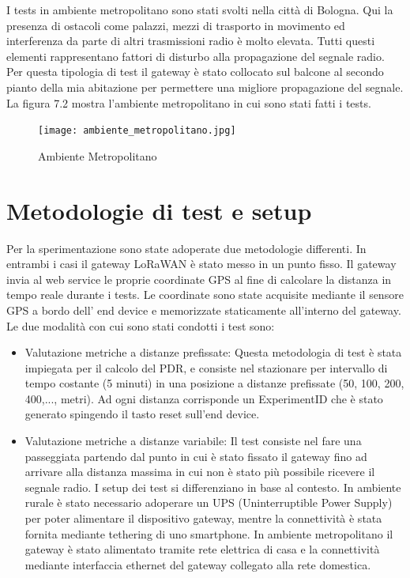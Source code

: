 \documentclass[12pt,a4paper,openright,twoside]{report}
\begin{document}
I tests in ambiente metropolitano sono stati svolti nella citt\`a di Bologna. Qui la presenza di ostacoli come palazzi, mezzi di trasporto in movimento ed interferenza da parte di altri trasmissioni radio \`e molto elevata. Tutti questi elementi rappresentano fattori di disturbo alla propagazione del segnale radio. Per questa tipologia di test il gateway \`e stato collocato sul balcone al secondo pianto della mia abitazione per permettere una migliore propagazione del segnale.
La figura 7.2 mostra l'ambiente metropolitano in cui sono stati fatti i tests.
\begin{figure}[h]                      
\begin{center} 
\texttt{[image: ambiente\_metropolitano.jpg]}
\caption[Ambiente Metropolitano]{Ambiente Metropolitano}\label{fig:prima}
\end{center}
\end{figure}

\section{Metodologie di test e setup}
Per la sperimentazione sono state adoperate due metodologie differenti. In entrambi i casi il gateway LoRaWAN \`e stato messo in un punto fisso. Il gateway invia al web service le proprie coordinate GPS al fine di calcolare la distanza in tempo reale durante i tests. Le coordinate sono state acquisite mediante il sensore GPS a bordo dell' end device e memorizzate staticamente all'interno del gateway.
Le due modalit\`a con cui sono stati condotti i test sono:
\begin{itemize}                       
\item Valutazione metriche a distanze prefissate: Questa metodologia di test \`e stata impiegata per il calcolo del PDR, e consiste nel stazionare per intervallo di tempo costante (5 minuti) in una posizione a distanze prefissate (50, 100, 200, 400,..., metri). Ad ogni distanza corrisponde un ExperimentID che \`e stato generato spingendo il tasto reset sull'end device.
\item Valutazione metriche a distanze variabile: Il test consiste nel fare una passeggiata partendo dal punto in cui \`e stato fissato il gateway fino ad arrivare alla distanza massima in cui non \`e stato pi\`u possibile ricevere il segnale radio.
I setup dei test si differenziano in base al contesto. In ambiente rurale \`e stato necessario adoperare un UPS (Uninterruptible Power Supply) per poter alimentare il dispositivo gateway, mentre la connettivit\`a \`e stata fornita mediante tethering di uno smartphone.  
In ambiente metropolitano il gateway \`e stato alimentato tramite rete elettrica di casa e la connettivit\`a mediante interfaccia ethernet del gateway collegato alla rete domestica.

\end{itemize}
\end{document}
